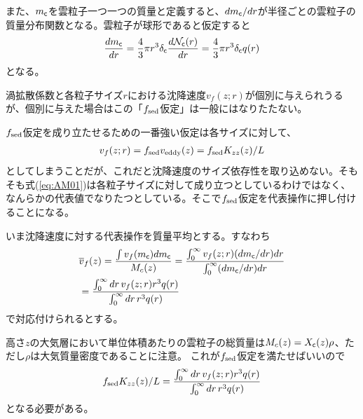 また、$m_{\mathsf{c}}$を雲粒子一つ一つの質量と定義すると、$dm_{\mathsf{c}}/dr$が半径ごとの雲粒子の質量分布関数となる。雲粒子が球形であると仮定すると
\begin{align}
    \frac{dm_{\mathsf{c}}}{dr} = \frac{4}{3} \pi r^3 \delta_{\mathsf{c}} \frac{d \mathcal{N}_{\mathsf{c}} (r)}{d r} = \frac{4}{3} \pi r^3 \delta_{\mathsf{c}} q(r)
\end{align}
となる。

渦拡散係数と各粒子サイズ$r$における沈降速度$v_f(z; r)$が個別に与えられうるが、個別に与えた場合はこの「$f_\mathrm{sed}$仮定」は一般にはなりたたない。

$f_\mathrm{sed}$仮定を成り立たせるための一番強い仮定は各サイズに対して、
\begin{align}
v_f(z; r)= f_\mathrm{sed} v_\mathrm{eddy}(z) = f_\mathrm{sed} K_{zz}(z)/L 
\end{align}
としてしまうことだが、これだと沈降速度のサイズ依存性を取り込めない。そもそも式(\ref{eq:AM01})は各粒子サイズに対して成り立つとしているわけではなく、なんらかの代表値でなりたつとしている。そこで$f_\mathrm{sed}$仮定を代表操作に押し付けることになる。

いま沈降速度に対する代表操作を質量平均とする。すなわち
\begin{align} 
\label{eq:fsedw}
&\overline{v}_f(z) = \frac{\int v_f(m_{\mathsf{c}}) dm_{\mathsf{c}}}{M_c(z)} = \frac{\int_0^\infty v_f(z; r) (dm_{\mathsf{c}}/dr) dr}{ \int_0^\infty (dm_{\mathsf{c}}/dr) dr } \nonumber \\
&= \frac{\int_0^\infty dr \, v_f(z;r) r^3 q(r)}{ \int_0^\infty dr \, r^3 q(r)}
\end{align}
で対応付けられるとする。


高さ$z$の大気層において単位体積あたりの雲粒子の総質量は$M_c(z) = X_{\mathsf{c}}(z) \rho $、ただし$\rho$は大気質量密度であることに注意。
これが$f_\mathrm{sed}$仮定を満たせばいいので
\begin{align} 
\label{eq:fsedw2}
f_\mathrm{sed} K_{zz}(z)/L = \frac{\int_0^\infty dr \, v_f(z;r) r^3 q(r)}{ \int_0^\infty dr \, r^3 q(r)}
\end{align}
となる必要がある。




